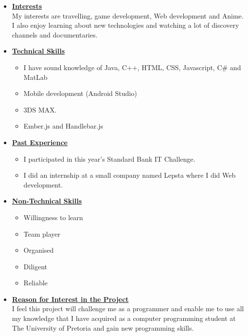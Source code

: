 \documentclass[a4paper,12pt]{article}
\begin{document}
\begin{itemize}
\item {\large \underline{\textbf{Interests}}}\\[0.2cm]
My interests are travelling, game development, Web development and Anime. I also enjoy learning about new technologies and watching a lot of discovery channels and documentaries.

\item {\large \underline{\textbf{Technical Skills}}}
	\begin{itemize}
		\item I have sound knowledge of Java, C++, HTML, CSS, Javascript, C\# and MatLab
		\item Mobile development (Android Studio) 
		\item 3DS MAX.
		\item Ember.js and  Handlebar.js
	\end{itemize}
\bigskip
\item {\large \underline{\textbf{Past Experience}}}
\begin{itemize}
\item I participated in this year's Standard Bank IT Challenge.
\item I did an internship at a small company named Lepsta where I did Web development.
\end{itemize}
\bigskip
\item {\large \underline{\textbf{Non-Technical Skills}}}
\begin{itemize}
\item Willingness to learn
\item Team player
\item Organised
\item Diligent
\item Reliable
\end{itemize}
\bigskip
\item {\Large \underline{\textbf{Reason for Interest in the Project}}}\\[0.2cm]
I feel this project will challenge me as a programmer and enable me to use all my knowledge that I have acquired as a computer programming student at The University of Pretoria and gain new programming skills.

\end{itemize}

\newpage
\end{document}
